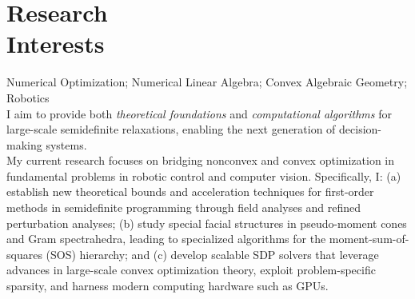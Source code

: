 
    \section{\mysidestyle Research\\Interests}

    Numerical Optimization; Numerical Linear Algebra; Convex Algebraic Geometry; Robotics \\[2mm]
    I aim to provide both \textit{theoretical foundations} and \textit{computational algorithms} for large-scale semidefinite relaxations, enabling the next generation of decision-making systems. \\[2mm]
    My current research focuses on bridging nonconvex and convex optimization in fundamental problems in robotic control and computer vision. Specifically, I: (a) establish new theoretical bounds and acceleration techniques for first-order methods in semidefinite programming through field analyses and refined perturbation analyses; (b) study special facial structures in pseudo-moment cones and Gram spectrahedra, leading to specialized algorithms for the moment-sum-of-squares (SOS) hierarchy; and (c) develop scalable SDP solvers that leverage advances in large-scale convex optimization theory, exploit problem-specific sparsity, and harness modern computing hardware such as GPUs.


